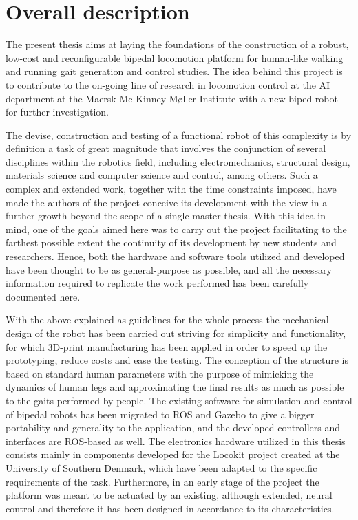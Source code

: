
\section{Overall description}
\label{sec:overall_description}
The present thesis aims at laying the foundations of the construction of a robust, low-cost and reconfigurable bipedal locomotion platform for human-like walking and running gait generation and control studies. 
The idea behind this project is to contribute to the on-going line of research in locomotion control at the AI department at the Maersk Mc-Kinney Møller Institute with a new biped robot for further investigation.

The devise, construction and testing of a functional robot of this complexity is by definition a task of great magnitude that involves the conjunction of several disciplines within the robotics field, including electromechanics, structural design, materials science and computer science and control, among others.
Such a complex and extended work, together with the time constraints imposed, have made the authors of the project conceive its development with the view in a further growth beyond the scope of a single master thesis.
With this idea in mind, one of the goals aimed here was to carry out the project facilitating to the farthest possible extent the continuity of its development by new students and researchers. 
Hence, both the hardware and software tools utilized and developed have been thought to be as general-purpose as possible, and all the necessary information required to replicate the work performed has been carefully documented here.

With the above explained as guidelines for the whole process the mechanical design of the robot has been carried out striving for simplicity and functionality, for which 3D-print manufacturing has been applied in order to speed up the prototyping, reduce costs and ease the testing.
The conception of the structure is based on standard human parameters with the purpose of mimicking the dynamics of human legs and approximating the final results as much as possible to the gaits performed by people.
The existing software for simulation and control of bipedal robots has been migrated to ROS \cite{ros} and Gazebo \cite{gazebo} to give a bigger portability and generality to the application, and the developed controllers and interfaces are ROS-based as well. 
The electronics hardware utilized in this thesis consists mainly in components developed for the Locokit project \cite{locokit} created at the University of Southern Denmark, which have been adapted to the specific requirements of the task.
Furthermore, in an early stage of the project the platform was meant to be actuated by an existing, although extended, neural control and therefore it has been designed in accordance to its characteristics.